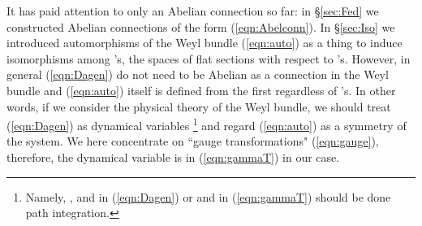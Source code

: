\documentclass[10pt,a4paper]{article}
\begin{document}
It has paid attention to only an Abelian connection so far: in \S\ref{sec:Fed} we constructed Abelian connections \coordHE{} of the form (\ref{eqn:Abelconn}). In \S\ref{sec:Iso} we introduced automorphisms of the Weyl bundle \coordHE{} (\ref{eqn:auto}) as a thing to induce isomorphisms among \coordHE{}'s, the spaces of flat sections with respect to \coordHE{}'s. However, in general \coordHE{} (\ref{eqn:Dagen}) do not need to be Abelian as a connection in the Weyl bundle and \coordHE{} (\ref{eqn:auto}) itself is defined from the first regardless of \coordHE{}'s. In other words, if we consider the physical theory of the Weyl bundle, we should treat \coordHE{} (\ref{eqn:Dagen}) as dynamical variables
\footnote{Namely, \myHighlight{$\Gamma$}\coordHE{}, \coordHE{} and \myHighlight{$\gamma$}\coordHE{} in (\ref{eqn:Dagen}) or \myHighlight{$\Gamma$}\coordHE{} and \coordHE{} in (\ref{eqn:gammaT}) should be done path integration.}
 and regard \coordHE{} (\ref{eqn:auto}) as a symmetry of the system. We here concentrate on ``gauge transformations" \coordHE{} (\ref{eqn:gauge}), therefore, the dynamical variable is \coordHE{} in \coordHE{} (\ref{eqn:gammaT}) in our case. \\
\end{document}
